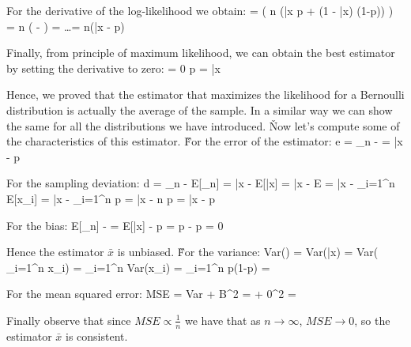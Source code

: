 For the derivative of the log-likelihood we obtain:
\bse
{} =  \Big( n (\bar{x} \ln p + (1 - \bar{x}) \ln(1-p)) \Big) =
n \Big(  -  \Big) =
\ldots = n(\bar{x} - p)
\ese

Finally, from principle of maximum likelihood, we can obtain the best estimator by setting the derivative to zero:
\bse
{} = 0 \Rightarrow p = \bar{x}
\ese

Hence, we proved that the estimator that maximizes the likelihood for a Bernoulli distribution is actually the
average of the sample. In a similar way we can show the same for all the distributions we have introduced. \v

Now let's compute some of the characteristics of this estimator. \v

For the error of the estimator:
\bse
e = \hat{\theta}_{n} - \theta = \bar{x} - p
\ese

For the sampling deviation:
\bse
d = \hat{\theta}_{n} - E[\hat{\theta}_{n}] = \bar{x} - E[\bar{x}] =
\bar{x} - E \Big[ \frac{1}{n} \sum_{i=1}^{n}x_{i} \Big] = \bar{x} -  \sum_{i=1}^{n} E[x_{i}] =
\bar{x} -  \sum_{i=1}^{n} p =
\bar{x} -  n p = \bar{x} - p
\ese

For the bias:
\bse
E[\hat{\theta}_{n}] - \theta = E[\bar{x}] - p = p - p = 0
\ese

Hence the estimator $\bar{x}$ is unbiased. \v

For the variance:
\bse
Var(\theta) = Var(\bar{x}) = Var( \sum_{i=1}^{n} x_{i}) =  \sum_{i=1}^{n} Var(x_{i}) =
 \sum_{i=1}^{n} p(1-p) = 
\ese

For the mean squared error:
\bse
MSE = Var + B^2 = + 0^2 = 
\ese

Finally observe that since $MSE \propto \frac{1}{n}$ we have that as $n \to \infty$, $MSE \to 0$, so the estimator
$\bar{x}$ is consistent.